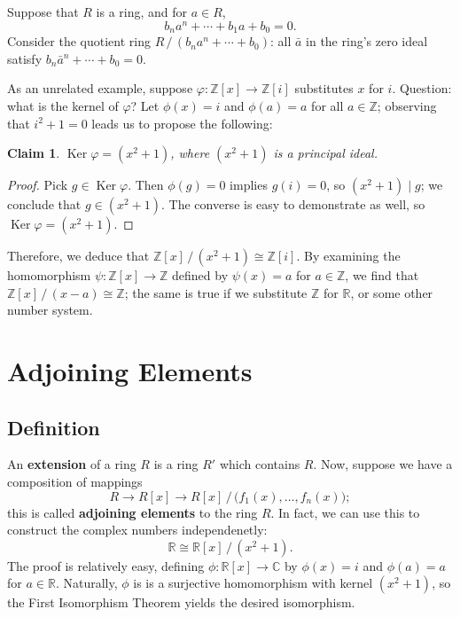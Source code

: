 \documentclass[11pt]{article}
\newtheorem{claim}{Claim}
\newcommand{\Ker}{\operatorname{Ker}}
\begin{document}
Suppose that $R$ is a ring, and for $a \in R$, 
\[
  b_{n}a^{n} + \cdots + b_{1}a + b_{0} = 0.
\]
Consider the quotient ring $R \,/\, (b_{n}a^{n} + \cdots + b_{0})$: all $\bar{a}$ in the ring's zero ideal satisfy $b_{n} \bar{a}^{n} + \cdots + b_{0} = 0$.

As an unrelated example, suppose $\varphi : \mathbb{Z}[x] \to \mathbb{Z}[i]$ substitutes $x$ for $i$. Question: what is the kernel of $\varphi$? Let $\phi(x) = i$ and $\phi(a) = a$ for all $a \in \mathbb{Z}$; observing that $i^{2} + 1 = 0$ leads us to propose the following:

\newpage

\begin{claim}
	$\Ker \varphi = (x^{2} + 1)$, where $(x^{2} + 1)$ is a principal ideal.
\end{claim}
\begin{adjustwidth}{0.5cm}{}
	\begin{proof}
		Pick $g \in \Ker \varphi$. Then $\phi(g) = 0$ implies $g(i) = 0$, so $(x^{2} + 1) \mid g$; we conclude that $g \in (x^{2} + 1)$. The converse is easy to demonstrate as well, so $\Ker \varphi = (x^{2} + 1)$.
	\end{proof}
\end{adjustwidth}

Therefore, we deduce that $\mathbb{Z}[x] \,/\, (x^{2} + 1) \cong \mathbb{Z}[i]$. By examining the homomorphism $\psi : \mathbb{Z}[x] \to \mathbb{Z}$ defined by $\psi(x) = a$ for $a \in \mathbb{Z}$, we find that $\mathbb{Z}[x] \,/\, (x - a) \cong \mathbb{Z}$; the same is true if we substitute $\mathbb{Z}$ for $\mathbb{R}$, or some other number system.


\section{Adjoining Elements}


\subsection{Definition}

An \textbf{extension} of a ring $R$ is a ring $R'$ which contains $R$. Now, suppose we have a composition of mappings
\[
  R \to R[x] \to R[x] \,/\, \big( f_{1}(x), \ldots, f_{n}(x) \big);
\]
this is called \textbf{adjoining elements} to the ring $R$. In fact, we can use this to construct the complex numbers independenetly:
\[
  \mathbb{R} \cong \mathbb{R}[x] \,/\, (x^{2} + 1).
\]
The proof is relatively easy, defining $\phi : \mathbb{R}[x] \to \mathbb{C}$ by $\phi(x) = i$ and $\phi(a) = a$ for $a \in \mathbb{R}$. Naturally, $\phi$ is is a surjective homomorphism with kernel $(x^{2} + 1)$, so the First Isomorphism Theorem yields the desired isomorphism.
\end{document}
